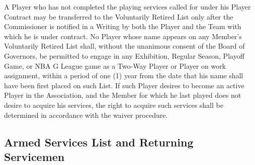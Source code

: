\documentclass[]{book}
\begin{document}
A Player who has not completed the playing services called for under his Player Contract may be transferred to the Voluntarily Retired List only after the Commissioner is notified in a Writing by both the Player and the Team with which he is under contract. No Player whose name appears on any Member's Voluntarily Retired List shall, without the unanimous consent of the Board of Governors, be permitted to engage in any Exhibition, Regular Season, Playoff Game, or NBA G League game as a Two-Way Player or Player on work assignment, within a period of one (1) year from the date that his name shall have been first placed on such List. If such Player desires to become an active Player in the Association, and the Member for which he last played does not desire to acquire his services, the right to acquire such services shall be determined in accordance with the waiver procedure.

\hypertarget{armed-services-list-and-returning-servicemen}{%
\subsection{Armed Services List and Returning Servicemen}\label{armed-services-list-and-returning-servicemen}}
\end{document}
